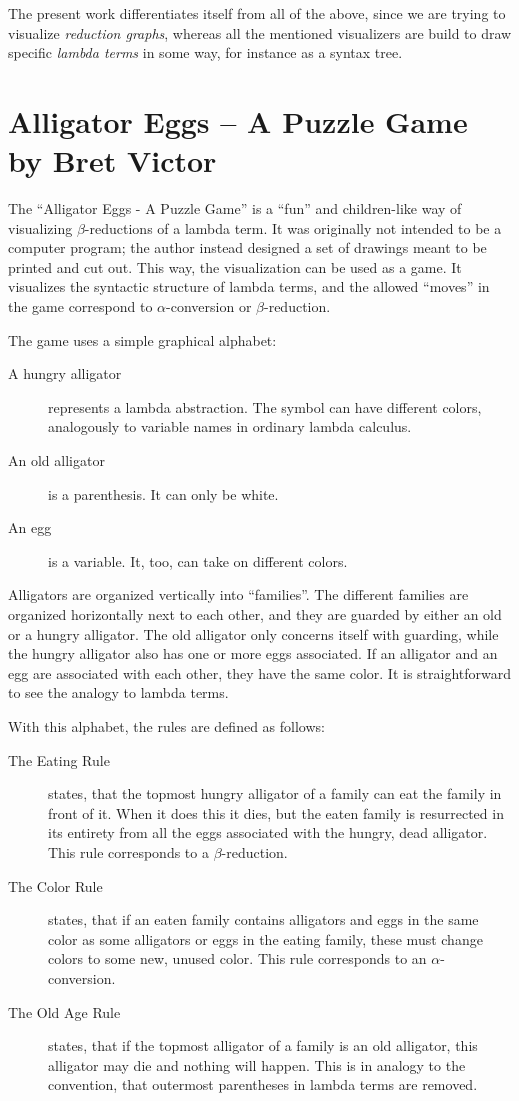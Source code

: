 The present work differentiates itself from all of the above, since we are
trying to visualize \emph{reduction graphs}, whereas all the mentioned visualizers
are build to draw specific \emph{lambda terms} in some way, for instance as a syntax
tree.

\section{Alligator Eggs -- A Puzzle Game by Bret Victor}

The ``Alligator Eggs - A Puzzle Game'' \cite{Alligator} is a ``fun'' and
children-like way of visualizing $\beta$-reductions of a lambda term. It was
originally not intended to be a computer program; the author instead designed
a set of drawings meant to be printed and cut out. This way, the visualization
can be used as a game. It visualizes the syntactic structure of lambda
terms, and the allowed ``moves'' in the game correspond to $\alpha$-conversion or
$\beta$-reduction.

The game uses a simple graphical alphabet:
\begin{description}
	\item[A hungry alligator] represents a lambda abstraction. The symbol can
	have different colors, analogously to variable names in ordinary lambda calculus.
	\item[An old alligator] is a parenthesis. It can only be white.
	\item[An egg] is a variable. It, too, can take on different colors.
\end{description}
Alligators are organized vertically into ``families''. The different families
are organized horizontally next to each other, and they are guarded by either an
old or a hungry alligator. The old alligator only concerns itself with
guarding, while the hungry alligator also has one or more eggs associated. If
an alligator and an egg are associated with each other, they have the same
color. It is straightforward to see the analogy to lambda terms.

With this alphabet, the rules are defined as follows:
\begin{description}
	\item[The Eating Rule] states, that the topmost hungry alligator of a family can
	eat the family in front of it. When it does this it dies, but the eaten family
	is resurrected in its entirety from all the eggs associated with the hungry, dead
	alligator. This rule corresponds to a $\beta$-reduction. 
	\item[The Color Rule] states, that if an eaten family contains alligators and eggs
	in the same color as some alligators or eggs in the eating family, these must change colors
	to some new, unused color. This rule corresponds to an $\alpha$-conversion.
	\item[The Old Age Rule] states, that if the topmost alligator of a family is
	an old alligator, this alligator may die and nothing will happen. This is in analogy
	to the convention, that outermost parentheses in lambda terms are removed.
\end{description}

